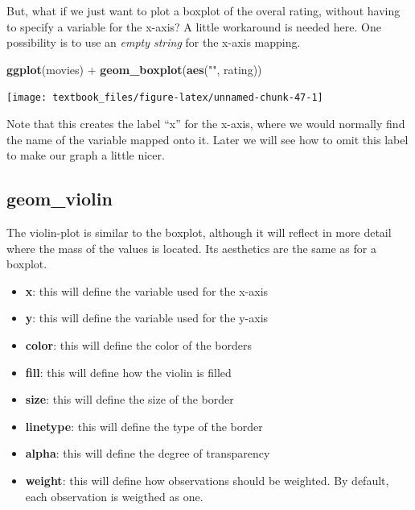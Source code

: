 \documentclass[]{tufte-book}
\newenvironment{Shaded}{}{}
\newcommand{\KeywordTok}[1]{\textcolor[rgb]{0.00,0.44,0.13}{\textbf{#1}}}
\newcommand{\NormalTok}[1]{#1}
\newcommand{\OperatorTok}[1]{\textcolor[rgb]{0.40,0.40,0.40}{#1}}
\newcommand{\StringTok}[1]{\textcolor[rgb]{0.25,0.44,0.63}{#1}}
\providecommand{\tightlist}{%
  \setlength{\itemsep}{0pt}\setlength{\parskip}{0pt}}
\begin{document}
But, what if we just want to plot a boxplot of the overal rating, without having to specify a variable for the x-axis? A little workaround is needed here. One possibility is to use an \emph{empty string} for the x-axis mapping.

\begin{Shaded}
\begin{Highlighting}[]
\KeywordTok{ggplot}\NormalTok{(movies) }\OperatorTok{+}
\StringTok{    }\KeywordTok{geom_boxplot}\NormalTok{(}\KeywordTok{aes}\NormalTok{(}\StringTok{""}\NormalTok{, rating))}
\end{Highlighting}
\end{Shaded}

\texttt{[image: textbook\_files/figure-latex/unnamed-chunk-47-1]}

Note that this creates the label ``x'' for the x-axis, where we would normally find the name of the variable mapped onto it. Later we will see how to omit this label to make our graph a little nicer.

\hypertarget{geom_violin}{%
\subsection{geom\_violin}\label{geom_violin}}

The violin-plot is similar to the boxplot, although it will reflect in more detail where the mass of the values is located. Its aesthetics are the same as for a boxplot.

\begin{itemize}
\tightlist
\item
  \textbf{x}: this will define the variable used for the x-axis
\item
  \textbf{y}: this will define the variable used for the y-axis
\item
  \textbf{color}: this will define the color of the borders
\item
  \textbf{fill}: this will define how the violin is filled
\item
  \textbf{size}: this will define the size of the border
\item
  \textbf{linetype}: this will define the type of the border
\item
  \textbf{alpha}: this will define the degree of transparency
\item
  \textbf{weight}: this will define how observations should be weighted. By default, each observation is weigthed as one.
\end{itemize}
\end{document}
